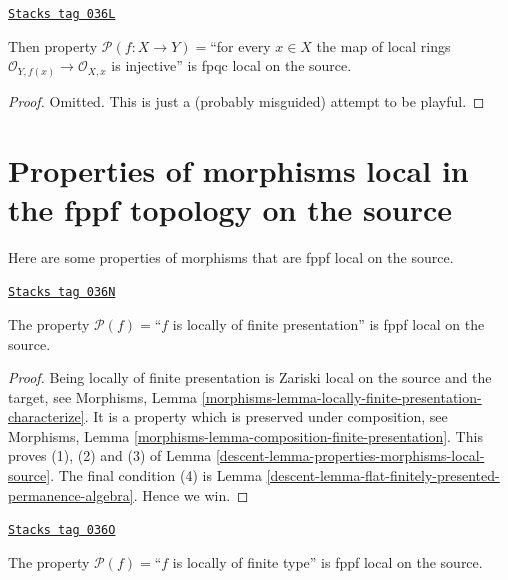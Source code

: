 \begin{lemma}
\label{descent-lemma-injective-local-rings-fpqc-local-source}
\href{https://stacks.math.columbia.edu/tag/036L}{\texttt{Stacks tag 036L}}

Then property
$\mathcal{P}(f : X \to Y)=$``for every $x \in X$ the map of local
rings $\mathcal{O}_{Y, f(x)} \to \mathcal{O}_{X, x}$ is injective''
is fpqc local on the source.
\end{lemma}

\begin{proof}
Omitted. This is just a (probably misguided) attempt to be playful.
\end{proof}

\section{Properties of morphisms local in the fppf topology on the source}
\label{descent-section-fppf-local-source}
Here are some properties of morphisms that are fppf local on the source.

\begin{lemma}
\label{descent-lemma-locally-finite-presentation-fppf-local-source}
\href{https://stacks.math.columbia.edu/tag/036N}{\texttt{Stacks tag 036N}}

The property $\mathcal{P}(f)=$``$f$ is locally of finite presentation''
is fppf local on the source.
\end{lemma}

\begin{proof}

Being locally of finite presentation is Zariski local on the source
and the target, see Morphisms,
Lemma \ref{morphisms-lemma-locally-finite-presentation-characterize}.
It is a property which is preserved under composition, see
Morphisms, Lemma \ref{morphisms-lemma-composition-finite-presentation}.
This proves
(1), (2) and (3) of Lemma \ref{descent-lemma-properties-morphisms-local-source}.
The final condition (4) is
Lemma \ref{descent-lemma-flat-finitely-presented-permanence-algebra}. Hence we win.
\end{proof}

\begin{lemma}
\label{descent-lemma-locally-finite-type-fppf-local-source}
\href{https://stacks.math.columbia.edu/tag/036O}{\texttt{Stacks tag 036O}}

The property $\mathcal{P}(f)=$``$f$ is locally of finite type''
is fppf local on the source.
\end{lemma}

